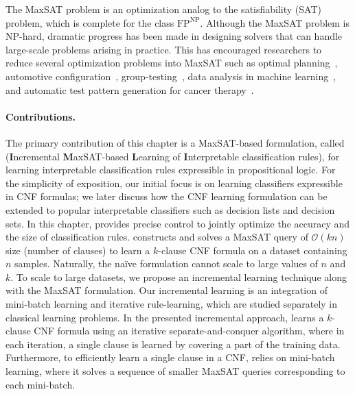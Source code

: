 The MaxSAT problem is an optimization analog to the satisfiability (SAT) problem, which is complete for the class $ \mathrm{FP}^{\mathrm{NP}} $. Although the MaxSAT problem is NP-hard, dramatic progress has been made in designing solvers that can handle large-scale problems arising in practice. This has encouraged researchers to reduce several optimization problems into MaxSAT such as  optimal planning~\cite{robinson2010partial}, automotive configuration~\cite{walter2013applications}, group-testing~\cite{CGSM2020}, data analysis in machine learning~\cite{berg2019applications}, and automatic test pattern generation for cancer therapy~\cite{lin2012application}. 



\paragraph{Contributions.} The primary contribution of this chapter is a MaxSAT-based formulation, called {\imli} (\textbf{I}ncremental \textbf{M}axSAT-based \textbf{L}earning of \textbf{I}nterpretable classification rules), for learning interpretable classification rules expressible in propositional logic. For the simplicity of exposition, our initial focus is on learning classifiers expressible in CNF formulas; we later discuss how the CNF learning formulation can be extended to popular interpretable classifiers such as decision lists and decision sets. In this chapter, {\imli} provides precise control to jointly optimize the accuracy and the size of classification rules. {\imli} constructs and solves a MaxSAT query of $ \mathcal{O}(kn) $  size (number of clauses) to learn a $ k $-clause CNF formula on a dataset containing $ n $ samples. Naturally, the na\"ive formulation cannot scale to large values of $ n $ and $ k $. To scale {\imli} to large datasets, we propose an incremental learning technique along with the MaxSAT formulation. Our incremental learning is an integration of mini-batch learning and iterative rule-learning, which are studied separately in classical learning problems. In the presented incremental approach, {\imli} learns a $ k $-clause CNF formula using an iterative separate-and-conquer algorithm, where in each iteration, a single clause is learned by covering a part of the training data. Furthermore, to efficiently learn a single clause in a CNF, {\imli} relies on mini-batch learning, where it solves a sequence of smaller MaxSAT queries corresponding to each mini-batch. 



